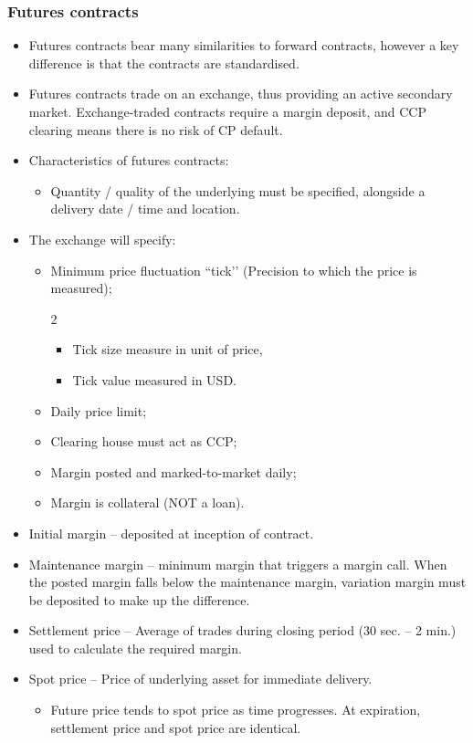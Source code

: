 \documentclass[../notes_compiled.tex]{subfiles}
\begin{document}
\subsubsection{Futures contracts}
\begin{itemize}
\item Futures contracts bear many similarities to forward contracts, however a key difference is that the contracts are standardised.
\item Futures contracts trade on an exchange, thus providing an active secondary market. Exchange-traded contracts require a margin deposit, and CCP clearing means there is no risk of CP default.
\item Characteristics of futures contracts:
\begin{itemize}
\item Quantity / quality of the underlying must be specified, alongside a delivery date / time and location.
\end{itemize}
\item The exchange will specify:
\begin{itemize}
\item Minimum price fluctuation ``tick’’ (Precision to which the price is measured);
\begin{multicols}{2}
\begin{itemize}
\item Tick size measure in unit of price,
\item Tick value measured in USD.
\end{itemize}
\end{multicols}
\item Daily price limit;
\item Clearing house must act as CCP;
\item Margin posted and marked-to-market daily;
\item Margin is collateral (NOT a loan).
\end{itemize}
\item Initial margin -- deposited at inception of contract.
\item Maintenance margin -- minimum margin that triggers a margin call. When the posted margin falls below the maintenance margin, variation margin must be deposited to make up the difference.
\item Settlement price -- Average of trades during closing period (30 sec. -- 2 min.) used to calculate the required margin.
\item Spot price -- Price of underlying asset for immediate delivery.
\begin{itemize}
\item Future price tends to spot price as time progresses. At expiration, settlement price and spot price are identical.
\end{itemize}
\end{itemize}
\end{document}
